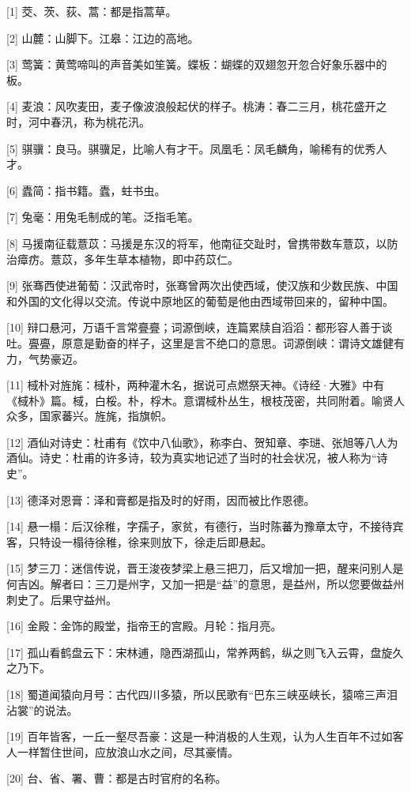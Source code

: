 \documentclass[12pt,UTF8]{ctexbook}
\begin{document}
[1] 茭、茨、荻、蒿：都是指蒿草。

[2] 山麓：山脚下。江皋：江边的高地。

[3] 莺簧：黄莺啼叫的声音美如笙簧。蝶板：蝴蝶的双翅忽开忽合好象乐器中的板。

[4] 麦浪：风吹麦田，麦子像波浪般起伏的样子。桃涛：春二三月，桃花盛开之时，河中春汛，称为桃花汛。

[5] 骐骥：良马。骐骥足，比喻人有才干。凤凰毛：凤毛麟角，喻稀有的优秀人才。

[6] 蠹简：指书籍。蠹，蛀书虫。

[7] 兔毫：用兔毛制成的笔。泛指毛笔。

[8] 马援南征载薏苡：马援是东汉的将军，他南征交趾时，曾携带数车薏苡，以防治瘴疠。薏苡，多年生草本植物，即中药苡仁。

[9] 张骞西使进葡萄：汉武帝时，张骞曾两次出使西域，使汉族和少数民族、中国和外国的文化得以交流。传说中原地区的葡萄是他由西域带回来的，留种中国。

[10] 辩口悬河，万语千言常亹亹；词源倒峡，连篇累牍自滔滔：都形容人善于谈吐。亹亹，原意是勤奋的样子，这里是言不绝口的意思。词源倒峡：谓诗文雄健有力，气势豪迈。

[11] 棫朴对旌旄：棫朴，两种灌木名，据说可点燃祭天神。《诗经·大雅》中有《棫朴》篇。棫，白桵。朴，桴木。意谓棫朴丛生，根枝茂密，共同附着。喻贤人众多，国家蕃兴。旌旄，指旗帜。

[12] 酒仙对诗史：杜甫有《饮中八仙歌》，称李白、贺知章、李琎、张旭等八人为酒仙。诗史：杜甫的许多诗，较为真实地记述了当时的社会状况，被人称为“诗史”。

[13] 德泽对恩膏：泽和膏都是指及时的好雨，因而被比作恩德。

[14] 悬一榻：后汉徐稚，字孺子，家贫，有德行，当时陈蕃为豫章太守，不接待宾客，只特设一榻待徐稚，徐来则放下，徐走后即悬起。

[15] 梦三刀：迷信传说，晋王浚夜梦梁上悬三把刀，后又增加一把，醒来问别人是何吉凶。解者曰：三刀是州字，又加一把是“益”的意思，是益州，所以您要做益州刺史了。后果守益州。

[16] 金殿：金饰的殿堂，指帝王的宫殿。月轮：指月亮。

[17] 孤山看鹤盘云下：宋林逋，隐西湖孤山，常养两鹤，纵之则飞入云霄，盘旋久之乃下。

[18] 蜀道闻猿向月号：古代四川多猿，所以民歌有“巴东三峡巫峡长，猿啼三声泪沾裳”的说法。

[19] 百年皆客，一丘一壑尽吾豪：这是一种消极的人生观，认为人生百年不过如客人一样暂住世间，应放浪山水之间，尽其豪情。

[20] 台、省、署、曹：都是古时官府的名称。
\end{document}
